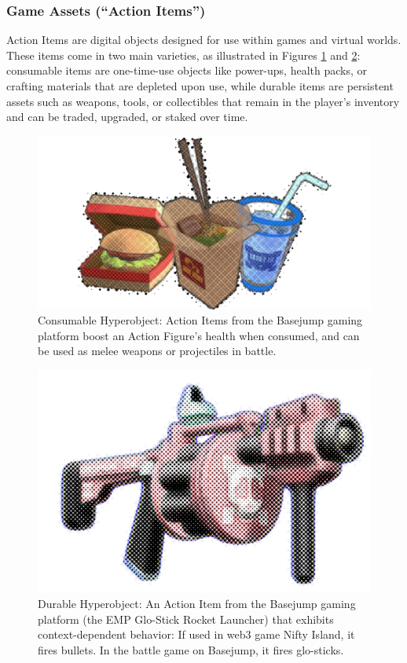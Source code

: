 \subsubsection{Game Assets (``Action Items'')}
Action Items are digital objects designed for use within games and virtual worlds. These items come in two main varieties, as illustrated in Figures \ref{fig:consumable_items} and \ref{fig:durable_items}: consumable items are one-time-use objects like power-ups, health packs, or crafting materials that are depleted upon use, while durable items are persistent assets such as weapons, tools, or collectibles that remain in the player's inventory and can be traded, upgraded, or staked over time.


\begin{figure}[t]
\centering
\includegraphics[width=0.9\columnwidth]{images/image4.png}
\vspace{1em}
\caption{Consumable Hyperobject: Action Items from the Basejump gaming platform boost an Action Figure's health when consumed, and can be used as melee weapons or projectiles in battle.}
\label{fig:consumable_items}
\end{figure} 



\begin{figure}[t]
\centering
\includegraphics[width=0.8\columnwidth]{images/image5.png}
\vspace{1em}
\caption{Durable Hyperobject: An Action Item from the Basejump gaming platform (the EMP Glo-Stick Rocket Launcher) that exhibits context-dependent behavior: If used in web3 game Nifty Island, it fires bullets. In the battle game on Basejump, it fires glo-sticks.}
\label{fig:durable_items}
\end{figure}


